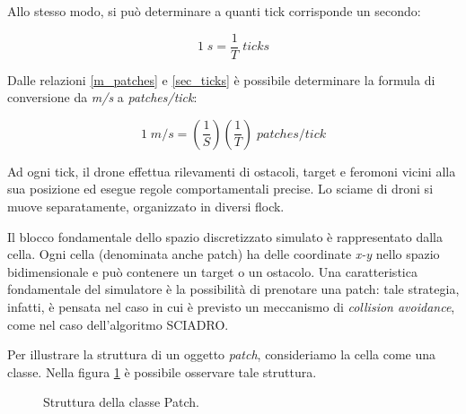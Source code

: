 Allo stesso modo, si può determinare a quanti tick corrisponde un secondo:

\begin{equation}
    \label{sec_ticks}
    1 \; s = \frac{1}{T} \; ticks
\end{equation}

Dalle relazioni \ref{m_patches} e \ref{sec_ticks} è possibile determinare la formula di conversione da \textit{m/s} a \textit{patches/tick}:

\begin{equation*}
    1 \; m/s = (\frac{1}{S})(\frac{1}{T}) \; patches/tick 
\end{equation*}

Ad ogni tick, il drone effettua rilevamenti di ostacoli, target e feromoni vicini alla sua posizione ed esegue regole comportamentali precise.
Lo sciame di droni si muove separatamente, organizzato in diversi flock.

Il blocco fondamentale dello spazio discretizzato simulato è rappresentato dalla cella.
Ogni cella (denominata anche patch) ha delle coordinate \textit{x-y} nello spazio bidimensionale e può contenere un target o un ostacolo.
Una caratteristica fondamentale del simulatore è la possibilità di prenotare una patch: tale strategia, infatti, è pensata nel caso in cui è previsto un meccanismo di \textit{collision avoidance}, come nel caso dell'algoritmo SCIADRO.

Per illustrare la struttura di un oggetto \textit{patch}, consideriamo la cella come una classe.
Nella figura \ref{classe_patch} è possibile osservare tale struttura.

\begin{figure}[H] 
    \captionsetup{justification=centering, margin=2cm, font=footnotesize}
    \begin{center}
    \end{center}
    \caption[short]{Struttura della classe Patch.}
    \label{classe_patch}
\end{figure}

